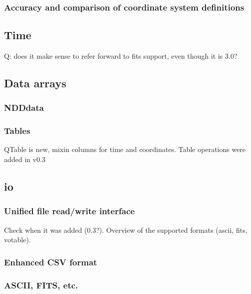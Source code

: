 \documentclass[modern]{aastex61}
\begin{document}
\subsubsection{Accuracy and comparison of coordinate system definitions}

\subsection{Time}
\label{sec:time}

Q: does it make sense to refer forward to fits support, even though it is 3.0?

\subsection{Data arrays}

\subsubsection{NDDdata}

\subsubsection{Tables}
\label{sec:table}
QTable is new, mixin columns for time and coordinates. Table operations were added in v0.3

\subsection{io}

\subsubsection{Unified file read/write interface}

Check when it was added (0.3?). Overview of the supported formats (ascii, fits, votable).

\subsubsection{Enhanced CSV format}

\subsubsection{ASCII, FITS, etc.}
\end{document}
